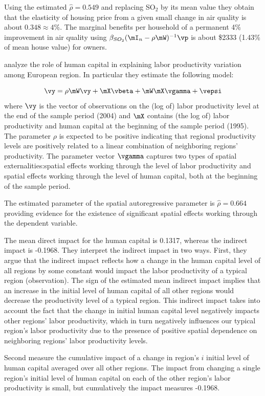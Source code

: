 \documentclass[english,12pt]{book}\usepackage[]{graphicx}\usepackage[]{xcolor}
\begin{document}
\begin{example}
Using the estimated $\widehat{\rho} =  0.549$ and replacing SO$_2$ by its mean value they obtain that the elasticity of housing price from a given small change in air quality is about $0.348 \approx 4\%$. The marginal benefits per household of a permanent 4\% improvement in air quality using $\beta_{SO_2}(\mI_n - \rho\mW)^{-1}\vp$ is about \$2333 (1.43\% of mean house value) for owners. 
\end{example}

\begin{example}
\cite{fischer2009impact} analyze the role of human capital in explaining labor productivity variation among European region. In particular they estimate the following model:

\begin{equation*}
\vy = \rho\mW\vy + \mX\vbeta + \mW\mX\vgamma +\vepsi
\end{equation*}
%
where $\vy$ is the vector of observations on the (log of) labor productivity level at the end of the sample period (2004) and $\mX$ contains (the log of) labor productivity and human capital at the beginning of the sample period (1995). The parameter $\rho$ is expected to be positive indicating that regional productivity levels are positively related to a linear combination of neighboring regions' productivity. The parameter vector $\vgamma$ captures two types of spatial externalities:spatial effects working through the level of labor productivity and spatial effects working through the level of human capital, both at the beginning of the sample period. 

The estimated parameter of the spatial autoregressive parameter is $\widehat{\rho} = 0.664$ providing evidence for the existence of significant spatial effects working through the dependent variable. 

The mean direct impact for the human capital is 0.1317, whereas the indirect impact is -0.1968. They interpret the indirect impact in two ways. First, they argue that the indirect impact reflects how a change in the human capital level of all regions by some constant would impact the labor productivity of a typical region (observation). The sign of the estimated mean indirect impact implies that an increase in the initial level of human capital of all other regions would decrease the productivity level of a typical region. This indirect impact takes into account the fact that the change in initial human capital level negatively impacts other regions' labor productivity, which in turn negatively influences our typical region's labor productivity due to the presence of positive spatial dependence on neighboring regions' labor productivity levels. 

Second \cite{fischer2009impact} measure the cumulative impact of a change in region's $i$ initial level of human capital averaged over all other regions.  The impact from changing a single region's initial level of human capital on each of the other region's labor productivity is small, but cumulatively the impact measures -0.1968.
\end{example}
\end{document}
